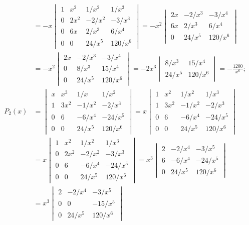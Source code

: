 \documentclass[openany]{book}
\newenvironment{sectionSolutions}{
 \begin{enumerate}[item-label={\thesection.\arabic{enumi}.}]
}{
 \end{enumerate}
}
\begin{document}
\begin{sectionSolutions}
\begin{alist}
\begin{align*}
&=-x\begin{vmatrix}
1&x^2&1/x^2&1/x^3\\
0&2x^2&-2/x^2&-3/x^3\\
0&6x&2/x^3&6/x^4\\0&0&24/x^5&120/x^6
\end{vmatrix}
=-x^2\begin{vmatrix}
2x&-2/x^3&-3/x^4\\
6x&2/x^3&6/x^4\\
0&24/x^5&120/x^6
\end{vmatrix}\\
&=-x^2\begin{vmatrix}
2x&-2/x^3&-3/x^4\\
0&8/x^3&15/x^4\\
0&24/x^5&120/x^6
\end{vmatrix}=
-2x^3\begin{vmatrix}
8/x^3&15/x^4\\
24/x^5&120/x^6
\end{vmatrix}=-\frac{1200}{ x^6};\\
P_2(x)&=
\begin{vmatrix}
x&x^3&1/x&1/x^2\\
1&3x^2&-1/x^2&-2/x^3\\
0&6&-6/x^4&-24/x^5\\
0&0&24/x^5&120/x^6
\end{vmatrix}=
x\begin{vmatrix}
1&x^2&1/x^2&1/x^3\\
1&3x^2&-1/x^2&-2/x^3\\
0&6&-6/x^4&-24/x^5\\
0&0&24/x^5&120/x^6
\end{vmatrix}\\
&=x\begin{vmatrix}
1&x^2&1/x^2&1/x^3\\
0&2x^2&-2/x^2&-3/x^3\\
0&6&-6/x^4&-24/x^5\\
0&0&24/x^5&120/x^6
\end{vmatrix}
=x^3\begin{vmatrix}
2&-2/x^4&-3/x^5\\
6&-6/x^4&-24/x^5\\
0&24/x^5&120/x^6
\end{vmatrix}\\
&=x^3\begin{vmatrix}
2&-2/x^4&-3/x^5\\
0&0&-15/x^5\\
0&24/x^5&120/x^6
\end{vmatrix}

\end{align*}
\end{alist}
\end{sectionSolutions}
\end{document}
